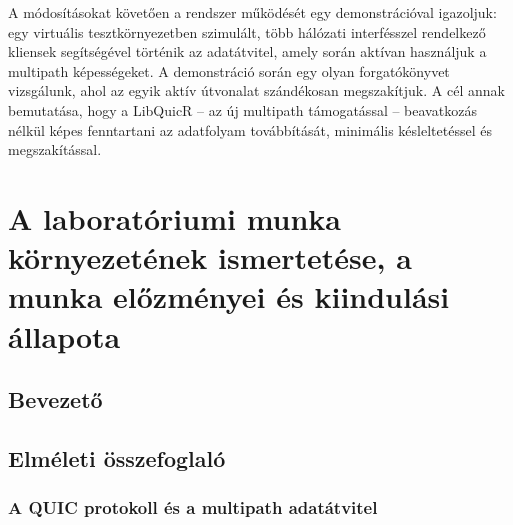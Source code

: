 \documentclass[a4paper,oneside]{article}
\begin{document}
\begin{titlepage}
{  A módosításokat követően a rendszer működését egy demonstrációval 
  igazoljuk: egy virtuális tesztkörnyezetben szimulált, több hálózati 
  interfésszel rendelkező kliensek segítségével történik az adatátvitel, 
  amely során aktívan használjuk a multipath képességeket. A demonstráció 
  során egy olyan forgatókönyvet vizsgálunk, ahol az egyik aktív 
  útvonalat szándékosan megszakítjuk. 
  A cél annak bemutatása, hogy a LibQuicR – az új multipath támogatással – 
  beavatkozás nélkül képes fenntartani az adatfolyam 
  továbbítását, minimális késleltetéssel és megszakítással.}

 
  
 
\end{titlepage} 

\section{A laboratóriumi munka környezetének ismertetése,
     a munka előzményei és kiindulási állapota}
\label{sec:kornyezet}
\subsection{Bevezető}
\label{sec:bevezeto}




\subsection{Elméleti összefoglaló}

\subsubsection{A QUIC protokoll és a multipath adatátvitel}
\end{document}
